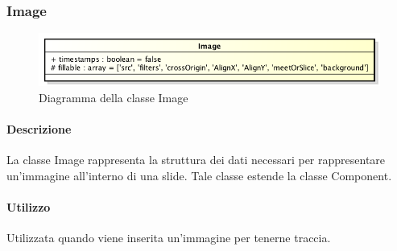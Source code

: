 \subsubsection{Image}

	\begin{figure}[h]
		\centering
		\includegraphics[width=0.8\linewidth]{img/back_end_premi_model_image}
		\caption[Diagramma della classe Image]{Diagramma della classe Image}
		\label{fig:back_end_premi_model_image}
	\end{figure}


	\paragraph{Descrizione}
	La classe Image rappresenta la struttura dei dati necessari per rappresentare un'immagine all'interno di una slide. Tale classe estende la classe Component.
	
	\paragraph{Utilizzo}
	Utilizzata quando viene inserita un'immagine per tenerne traccia.
	
